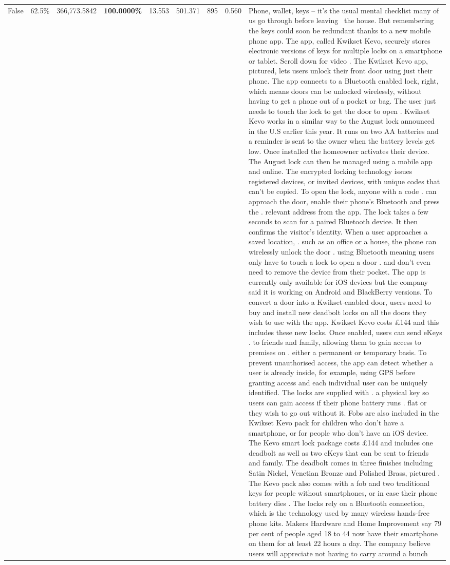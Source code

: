 \begin{table}[H]
\begin{tabular}{lllrlllll}
False & 62.5\% & 366,773.5842 & \bfseries \color{red} 100.0000\% & 13.553 & 501.371 & 895 & 0.560 & Phone, wallet, keys – it’s the usual mental checklist many of us go through before leaving  the house. But remembering the keys could soon be redundant thanks to a new mobile phone app. The app, called Kwikset Kevo, securely stores electronic versions of keys for multiple locks on a smartphone or tablet. Scroll down for video . The Kwikset Kevo app, pictured, lets users unlock their front door using just their phone. The app connects to a Bluetooth enabled lock, right, which means doors can be unlocked wirelessly, without having to get a phone out of a pocket or bag. The user just needs to touch the lock to get the door to open . Kwikset Kevo works in a similar way to the August lock announced in the U.S earlier this year. It runs on two AA batteries and a reminder is sent to the owner when the battery levels get low. Once installed the homeowner activates their device. The August lock can then be managed using a mobile app and online. The encrypted locking technology issues registered devices, or invited devices, with unique codes that can't be copied. To open the lock, anyone with a code . can approach the door, enable their phone's Bluetooth and press the . relevant address from the app. The lock takes a few seconds to scan for a paired Bluetooth device. It then confirms the visitor's identity. When a user approaches a saved location, . such as an office or a house, the phone can wirelessly unlock the door . using Bluetooth meaning users only have to touch a lock to open a door . and don't even need to remove the device from their pocket. The app is currently only available for iOS devices but the company said it is working on Android and BlackBerry versions. To convert a door into a Kwikset-enabled door, users need to buy and install new deadbolt locks on all the doors they wish to use with the app. Kwikset Kevo costs £144 and this includes these new locks. Once enabled, users can send eKeys . to friends and family, allowing them to gain access to premises on . either a permanent or temporary basis. To prevent unauthorised access, the app can detect whether a user is already inside, for example, using GPS before granting access and each individual user can be uniquely identified. The locks are supplied with . a physical key so users can gain access if their phone battery runs . flat or they wish to go out without it. Fobs are also included in the Kwikset Kevo pack for children who don't have a smartphone, or for people who don't have an iOS device. The Kevo smart lock package costs £144 and includes one deadbolt as well as two eKeys that can be sent to friends and family. The deadbolt comes in three finishes including Satin Nickel, Venetian Bronze and Polished Brass, pictured . The Kevo pack also comes with a fob and two traditional keys for people without smartphones, or in case their phone battery dies . The locks rely on a Bluetooth connection, which is the technology used by many wireless hands-free phone kits. Makers Hardware and Home Improvement say 79 per cent of people aged 18 to 44 now have their smartphone on them for at least 22 hours a day. The company believe users will appreciate not having to carry around a bunch 
\end{tabular}
\end{table}
